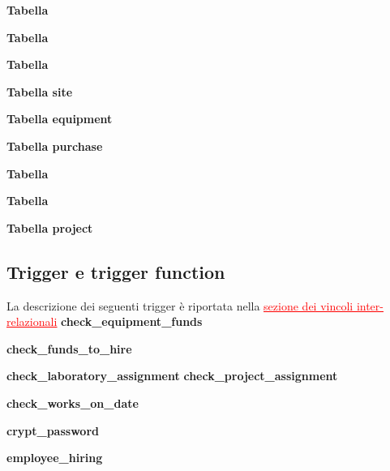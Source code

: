 \noindent \textbf{Tabella \takepart}
\bigskip

\noindent \textbf{Tabella \projectsalaried}
\bigskip

\newpage
\noindent \textbf{Tabella \workson}
\bigskip

\noindent \textbf{Tabella site}
\bigskip

\noindent \textbf{Tabella equipment}
\bigskip

\newpage
\noindent \textbf{Tabella purchase}
\bigskip

\noindent \textbf{Tabella \worksat}
\bigskip

\newpage
\noindent \textbf{Tabella \equipmentrequest}
\bigskip

\noindent \textbf{Tabella project}
\bigskip

\newpage
\subsection{Trigger e trigger function}\label{trigger}
La descrizione dei seguenti trigger è riportata nella \hyperref[vincoli_inter_relazionali]{\textcolor{red}{\underline{sezione dei vincoli inter-relazionali}}}\meskip
\noindent \textbf{check\_equipment\_funds}
\bigskip

\noindent \textbf{check\_funds\_to\_hire}
\bigskip

\newpage
\noindent \textbf{check\_laboratory\_assignment}
\bigskip
\newpage
\noindent \textbf{check\_project\_assignment}
\bigskip

\newpage
\noindent \textbf{check\_works\_on\_date}
\bigskip

\noindent \textbf{crypt\_password}
\bigskip

\newpage
\noindent \textbf{employee\_hiring}
\bigskip

